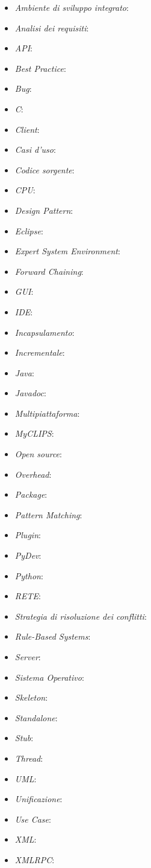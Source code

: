 \begin{itemize}
	\item \emph{Ambiente di sviluppo integrato}:
	\item \emph{Analisi dei requisiti}:
	\item \emph{API}:
	\item \emph{Best Practice}:
	\item \emph{Bug}:
	\item \emph{C}:	
	\item \emph{Client}:
	\item \emph{Casi d'uso}:
	\item \emph{Codice sorgente}:
	\item \emph{CPU}:
	\item \emph{Design Pattern}:
	\item \emph{Eclipse}:
	\item \emph{Expert System Environment}:
	\item \emph{Forward Chaining}:
	\item \emph{GUI}:
	\item \emph{IDE}:
	\item \emph{Incapsulamento}:
	\item \emph{Incrementale}:
	\item \emph{Java}:
	\item \emph{Javadoc}:
	\item \emph{Multipiattaforma}:
	\item \emph{MyCLIPS}:
	\item \emph{Open source}:
	\item \emph{Overhead}:
	\item \emph{Package}:
	\item \emph{Pattern Matching}:
	\item \emph{Plugin}:
	\item \emph{PyDev}:
	\item \emph{Python}:
	\item \emph{RETE}:
	\item \emph{Strategia di risoluzione dei conflitti}:
	\item \emph{Rule-Based Systems}:
	\item \emph{Server}:
	\item \emph{Sistema Operativo}:
	\item \emph{Skeleton}:
	\item \emph{Standalone}:
	\item \emph{Stub}:
	\item \emph{Thread}:
	\item \emph{UML}:
	\item \emph{Unificazione}:
	\item \emph{Use Case}:
	\item \emph{XML}:
	\item \emph{XMLRPC}:
\end{itemize}


